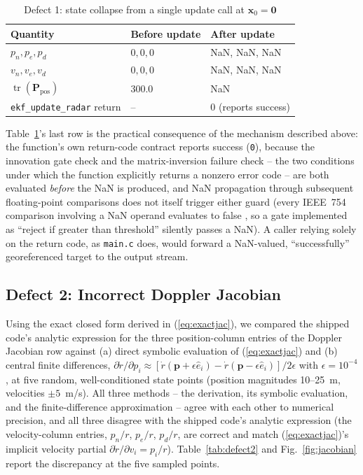 \documentclass[conference]{IEEEtran}
\begin{document}
\begin{table}[htbp]
\caption{Defect 1: state collapse from a single update call at $\mathbf{x}_0 = \mathbf{0}$}
\begin{center}
\begin{tabular}{@{}lll@{}}
\toprule
\textbf{Quantity} & \textbf{Before update} & \textbf{After update} \\
\midrule
$p_n, p_e, p_d$ & $0, 0, 0$ & NaN, NaN, NaN \\
$v_n, v_e, v_d$ & $0, 0, 0$ & NaN, NaN, NaN \\
$\operatorname{tr}(\mathbf{P}_{\text{pos}})$ & $300.0$ & NaN \\
\texttt{ekf\_update\_radar} return & -- & $0$ (reports success) \\
\bottomrule
\end{tabular}
\end{center}
\label{tab:defect1}
\end{table}

Table~\ref{tab:defect1}'s last row is the practical consequence of the mechanism described above: the function's own return-code contract reports success (\texttt{0}), because the innovation gate check and the matrix-inversion failure check -- the two conditions under which the function explicitly returns a nonzero error code -- are both evaluated \emph{before} the NaN is produced, and NaN propagation through subsequent floating-point comparisons does not itself trigger either guard (every IEEE~754 comparison involving a NaN operand evaluates to false \cite{r16}, so a gate implemented as ``reject if greater than threshold'' silently passes a NaN). A caller relying solely on the return code, as \texttt{main.c} does, would forward a NaN-valued, ``successfully'' georeferenced target to the output stream.

\subsection{Defect 2: Incorrect Doppler Jacobian}

Using the exact closed form derived in (\ref{eq:exactjac}), we compared the shipped code's analytic expression for the three position-column entries of the Doppler Jacobian row against (a) direct symbolic evaluation of (\ref{eq:exactjac}) and (b) central finite differences, $\partial \dot r/\partial p_i \approx [\dot r(\mathbf{p}+\epsilon\hat{e}_i) - \dot r(\mathbf{p}-\epsilon\hat{e}_i)]/2\epsilon$ with $\epsilon = 10^{-4}$, at five random, well-conditioned state points (position magnitudes 10--25~m, velocities $\pm 5$~m/s). All three methods -- the derivation, its symbolic evaluation, and the finite-difference approximation -- agree with each other to numerical precision, and all three disagree with the shipped code's analytic expression (the velocity-column entries, $p_n/r$, $p_e/r$, $p_d/r$, are correct and match (\ref{eq:exactjac})'s implicit velocity partial $\partial \dot r/\partial v_i = p_i/r$). Table~\ref{tab:defect2} and Fig.~\ref{fig:jacobian} report the discrepancy at the five sampled points.
\end{document}
